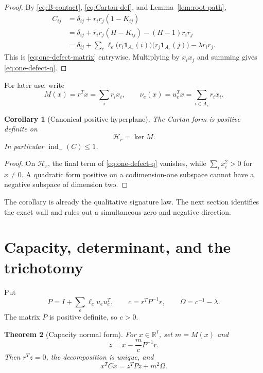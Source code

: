 \documentclass[11pt,a4paper]{amsart}
\theoremstyle{plain}
\newtheorem{theorem}{Theorem}[section]
\newtheorem{corollary}[theorem]{Corollary}
\theoremstyle{definition}
\newcommand{\RR}{\mathbb R}
\newcommand{\one}{\mathbf 1}
\newcommand{\indm}{\operatorname{ind}_{-}}
\newcommand{\Hcal}{\mathcal H}
\begin{document}
\begin{proof}
By \eqref{eq:B-contact}, \eqref{eq:Cartan-def}, and Lemma~\ref{lem:root-path},
\begin{align*}
 C_{ij}
 &=\delta_{ij}+r_ir_j(1-K_{ij})\\
 &=\delta_{ij}+r_ir_j(H-K_{ij})-(H-1)r_ir_j\\
 &=\delta_{ij}+\sum_e\ell_e
   \bigl(r_i\one_{A_e}(i)\bigr)\bigl(r_j\one_{A_e}(j)\bigr)
   -\lambda r_ir_j.
\end{align*}
This is \eqref{eq:one-defect-matrix} entrywise.  Multiplying by $x_ix_j$ and summing gives
\eqref{eq:one-defect-q}.
\end{proof}

For later use, write
\begin{equation}\label{eq:mass-conormals}
 M(x)=r^Tx=\sum_i r_ix_i,
 \qquad \nu_e(x)=u_e^Tx=\sum_{i\in A_e}r_ix_i.
\end{equation}

\begin{corollary}[Canonical positive hyperplane]\label{cor:hyperplane}
The Cartan form is positive definite on
\[
                         \Hcal_r=\ker M.
\]
In particular $\indm(C)\le1$.
\end{corollary}

\begin{proof}
On $\Hcal_r$, the final term of \eqref{eq:one-defect-q} vanishes, while
$\sum_i x_i^2>0$ for $x\ne0$.  A quadratic form positive on a codimension-one subspace cannot have
a negative subspace of dimension two.
\end{proof}

The corollary is already the qualitative signature law.  The next section identifies the exact
wall and rules out a simultaneous zero and negative direction.

\section{Capacity, determinant, and the trichotomy}\label{sec:capacity}

Put
\begin{equation}\label{eq:P-c-Omega}
 P=I+\sum_e\ell_eu_eu_e^T,\qquad
 c=r^TP^{-1}r,\qquad
 \Omega=c^{-1}-\lambda.
\end{equation}
The matrix $P$ is positive definite, so $c>0$.

\begin{theorem}[Capacity normal form]\label{thm:capacity-normal}
For $x\in\RR^I$, set $m=M(x)$ and
\begin{equation}\label{eq:centered-z}
 z=x-\frac{m}{c}P^{-1}r.
\end{equation}
Then $r^Tz=0$, the decomposition is unique, and
\begin{equation}\label{eq:capacity-completion}
 \boxed{\quad x^TCx=z^TPz+m^2\Omega.\quad}
\end{equation}
\end{theorem}
\end{document}
